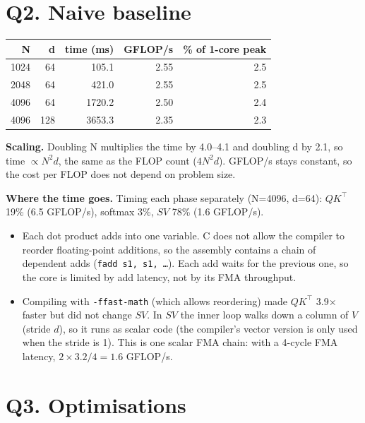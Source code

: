 \documentclass[10pt,a4paper]{article}
\begin{document}
\section*{Q2. Naive baseline}

\begin{tabular}{@{}rrrrr@{}}
\toprule
N & d & time (ms) & GFLOP/s & \% of 1-core peak \\
\midrule
1024 & 64 & 105.1 & 2.55 & 2.5 \\
2048 & 64 & 421.0 & 2.55 & 2.5 \\
4096 & 64 & 1720.2 & 2.50 & 2.4 \\
4096 & 128 & 3653.3 & 2.35 & 2.3 \\
\bottomrule
\end{tabular}

\textbf{Scaling.} Doubling N multiplies the time by 4.0--4.1 and doubling d by 2.1, so time $\propto N^2 d$, the same as the FLOP count ($4N^2d$). GFLOP/s stays constant, so the cost per FLOP does not depend on problem size.

\textbf{Where the time goes.} Timing each phase separately (N=4096, d=64): $QK^\top$ 19\% (6.5 GFLOP/s), softmax 3\%, $SV$ 78\% (1.6 GFLOP/s).
\begin{itemize}
\item Each dot product adds into one variable. C does not allow the compiler to reorder floating-point additions, so the assembly contains a chain of dependent adds (\texttt{fadd s1, s1, \ldots}). Each add waits for the previous one, so the core is limited by add latency, not by its FMA throughput.
\item Compiling with \texttt{-ffast-math} (which allows reordering) made $QK^\top$ 3.9$\times$ faster but did not change $SV$. In $SV$ the inner loop walks down a column of $V$ (stride $d$), so it runs as scalar code (the compiler's vector version is only used when the stride is 1). This is one scalar FMA chain: with a 4-cycle FMA latency, $2 \times 3.2/4 = 1.6$ GFLOP/s.
\end{itemize}

\section*{Q3. Optimisations}
\end{document}
